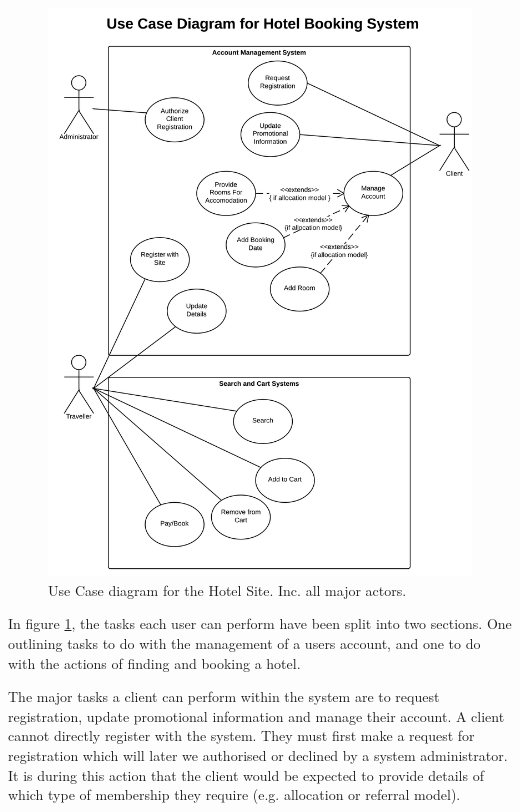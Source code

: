 \documentclass{article}
\begin{document}
\begin{figure}[H]
\centering
\includegraphics[width=1\textwidth]{img/UseCase.png}
\caption{Use Case diagram for the Hotel Site. Inc. all major actors.}
\label{fig:use-case}
\end{figure}

In figure \ref{fig:use-case}, the tasks each user can perform have been split into two sections. One outlining tasks to do with the management of a users account, and one to do with the actions of finding and booking a hotel.

The major tasks a client can perform within the system are to request registration, update promotional information and manage their account. A client cannot directly register with the system. They must first make a request for registration which will later we authorised or declined by a system administrator. It is during this action that the client would be expected to provide details of which type of membership they require (e.g. allocation or referral model).
\end{document}
